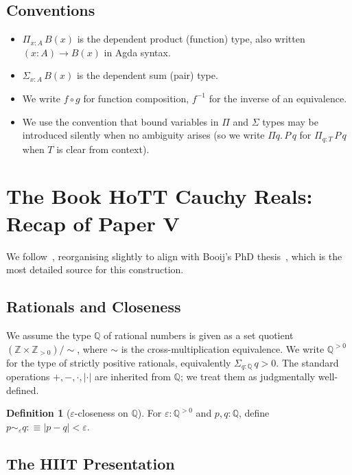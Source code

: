 \documentclass[12pt]{article}
\theoremstyle{definition}
\newtheorem{definition}[theorem]{Definition}
\theoremstyle{remark}
\newcommand{\Z}{\mathbb{Z}}
\newcommand{\Q}{\mathbb{Q}}
\newcommand{\close}{\mathrel{\sim}}
\begin{document}
\subsection{Conventions}

\begin{itemize}
\item $\Pi_{x : A}\, B(x)$ is the dependent product (function) type,
also written $(x : A) \to B(x)$ in Agda syntax.
\item $\Sigma_{x : A}\, B(x)$ is the dependent sum (pair) type.
\item We write $f \circ g$ for function composition,
$f^{-1}$ for the inverse of an equivalence.
\item We use the convention that bound variables in
$\Pi$ and $\Sigma$ types may be introduced silently when no ambiguity
arises (so we write $\Pi q.\, P\,q$ for $\Pi_{q : T}\, P\,q$ when $T$
is clear from context).
\end{itemize}

\section{The Book HoTT Cauchy Reals: Recap of Paper V}
\label{sec:hott-recap}

We follow~\cite[\S 11.3]{HoTTBook}, reorganising slightly to align with
Booij's PhD thesis~\cite{Booij2020}, which is the most detailed source
for this construction.

\subsection{Rationals and Closeness}

We assume the type $\Q$ of rational numbers is given as a set quotient
$(\Z \times \Z_{>0}) /\!\!\sim$, where $\sim$ is the cross-multiplication
equivalence. We write $\Q^{>0}$ for the type of strictly positive
rationals, equivalently $\Sigma_{q : \Q}\, q > 0$. The standard
operations $+, -, \cdot, |\cdot|$ are inherited from $\Q$; we treat them
as judgmentally well-defined.

\begin{definition}[$\varepsilon$-closeness on $\Q$]
\label{def:close-Q}
For $\varepsilon : \Q^{>0}$ and $p, q : \Q$, define
$p \close_{\varepsilon} q :\equiv |p - q| < \varepsilon$.
\end{definition}

\subsection{The HIIT Presentation}
\end{document}
